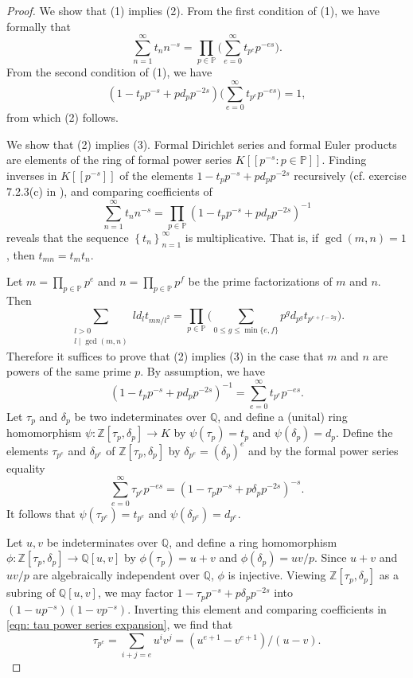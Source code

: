 \documentclass[10pt,leqno,twoside]{article}
\theoremstyle{plain}
\theoremstyle{definition}
\numberwithin{equation}{section}
\numberwithin{lem}{section}
\newcommand{\cbr}[1]{\left\{#1\right\}}
\begin{document}
\begin{proof}
    We show that (1) implies (2). From the first condition of (1), we have formally that 
    \[\sum_{n=1}^\infty t_nn^{-s} = \prod_{p\in\mathbb P}\bigg(\sum_{e=0}^\infty t_{p^e}p^{-es}\bigg).\]
    From the second condition of (1), we have \[(1-t_pp^{-s} + pd_pp^{-2s})\bigg(\sum_{e=0}^\infty t_{p^e}p^{-es}\bigg) = 1,\] from which (2) follows. 

    We show that (2) implies (3). Formal Dirichlet series and formal Euler products are elements of the ring of formal power series $K[[p^{-s} : p\in\mathbb P]]$. Finding inverses in $K[[p^{-s}]]$ of the elements $1-t_pp^{-s} + pd_pp^{-2s}$ recursively (cf. exercise 7.2.3(c) in \cite{df}), and comparing coefficients of \[\sum_{n=1}^\infty t_nn^{-s} = \prod_{p\in\mathbb P}(1-t_pp^{-s} + pd_pp^{-2s})^{-1}\] reveals that the sequence $\cbr{t_n}_{n=1}^\infty$ is multiplicative. That is, if $\gcd(m,n) =1$, then $t_{mn} = t_mt_n$.
    
    Let $m = \prod_{p\in\mathbb P}p^e$ and $n = \prod_{p\in\mathbb P}p^f$ be the prime factorizations of $m$ and $n$. Then \[\sum_{\substack{l>0\\l\mid\gcd(m,n)}} ld_lt_{mn/l^2} = \prod_{p\in\mathbb P} \bigg(\sum_{0\leq g\leq\min\{e,f\}}p^gd_{p^g}t_{p^{e+f-2g}}\bigg).\] Therefore it suffices to prove that (2) implies (3) in the case that $m$ and $n$ are powers of the same prime $p$. By assumption, we have 
    \[(1-t_pp^{-s} + pd_pp^{-2s})^{-1} = \sum_{e=0}^\infty t_{p^e}p^{-es}.\] Let $\tau_p$ and $\delta_p$ be two indeterminates over $\mathbb Q$, and define a (unital) ring homomorphism $\psi\colon \mathbb Z[\tau_p,\delta_p]\to K$ by $\psi(\tau_p) = t_p$ and $\psi(\delta_p) = d_p$. Define the elements $\tau_{p^e}$ and $\delta_{p^e}$ of $\mathbb Z[\tau_p,\delta_p]$ by $\delta_{p^e} = (\delta_p)^e$ and by the formal power series equality 
    \begin{equation}\label{eqn: tau power series expansion}
        \sum_{e=0}^\infty \tau_{p^e}p^{-es} = (1-\tau_pp^{-s} + p\delta_pp^{-2s})^{-s}.
    \end{equation} It follows that $\psi(\tau_{p^e}) = t_{p^e}$ and $\psi(\delta_{p^e}) = d_{p^e}$.

    Let $u,v$ be indeterminates over $\mathbb Q$, and define a ring homomorphism $\phi\colon \mathbb Z[\tau_p,\delta_p]\to \mathbb Q[u,v]$ by $\phi(\tau_p) = u+v$ and $\phi(\delta_p) = uv/p$. Since $u+v$ and $uv/p$ are algebraically independent over $\mathbb Q$, $\phi$ is injective. Viewing $\mathbb Z[\tau_p,\delta_p]$ as a subring of $\mathbb Q[u,v]$, we may factor $1-\tau_pp^{-s}+p\delta_pp^{-2s}$ into $(1-up^{-s})(1-vp^{-s})$. Inverting this element and comparing coefficients in \cref{eqn: tau power series expansion}, we find that
    \[\tau_{p^e} = \sum_{i+j=e}u^iv^j = (u^{e+1}-v^{e+1})/(u-v).\]


\end{proof}
\end{document}
